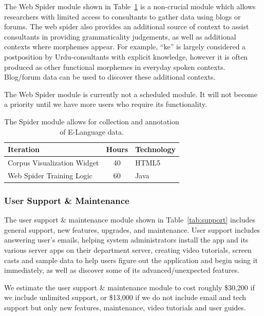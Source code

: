 \documentclass[12pt]{article}
\begin{document}
The Web Spider module shown in Table~\ref{table-spider} is a non-crucial module which allows researchers with limited access to consultants to gather data using blogs or forums. The web spider also provides an additional source of context to assist consultants in providing grammaticality judgements, as well as additional contexts where morphemes appear. For example, ``ke'' is largely considered a postposition by Urdu-consultants with explicit knowledge, however it is often produced as other functional morphemes in everyday spoken contexts. Blog/forum data can be used to discover these additional contexts.


The Web Spider module is currently not a scheduled module.  It will not become a priority until we have more users who require its functionality.

\begin{table}[htbp]

\begin{center}
  \begin{tabular}{ | lcl | }
\hline
Iteration&  Hours&  Technology  \\
\hline
Corpus Visualization Widget&  40& HTML5 \\ 
Web Spider Training Logic&  60& Java  \\ 
\hline
  \end{tabular}
  \caption{The Spider module allows for collection and annotation of E-Language data.}
\label{table-spider}
  \end{center}
\end{table}



\newpage
\subsubsection{User Support \& Maintenance}

The user support  \& maintenance module shown in Table~\ref{tab:support} includes general support, new features, upgrades, and maintenance. User support includes answering user's emails, helping system administrators install the app and its various server apps on their department server, creating video tutorials, screen casts and sample data to help users figure out the application and begin using it immediately, as well as discover some of its advanced/unexpected features. 

We estimate the user support \& maintenance module to cost roughly \$30,200 if we include unlimited support, or \$13,000 if we do not include email and tech support but only new features, maintenance, video tutorials and user guides.
\end{document}
